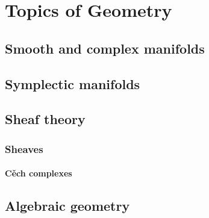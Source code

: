 \part{Topics of Geometry}

\chapter{Smooth and complex manifolds}



\chapter{Symplectic manifolds}

\chapter{Sheaf theory}

\section{Sheaves}

\subsection{Cěch complexes}



\chapter{Algebraic geometry}


